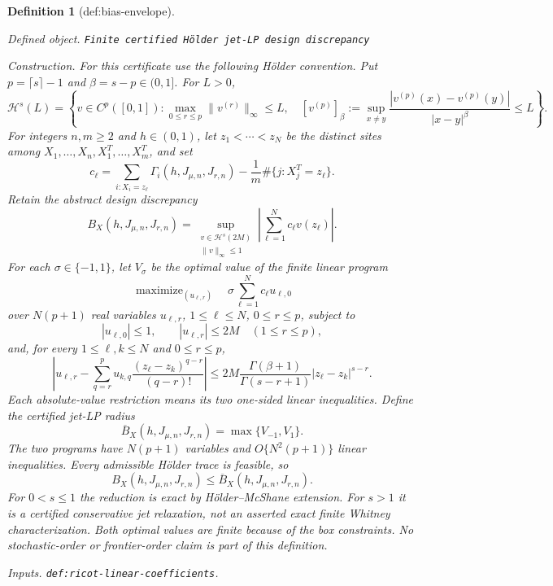 \documentclass{article}
\newtheorem{definition}{Definition}
\begin{document}
\begin{definition}[def:bias-envelope]\label{def:bias-envelope}
\par\smallskip\noindent\emph{Defined object.} \texttt{Finite certified Hölder jet-\allowbreak{}LP design discrepancy}
\par\smallskip\noindent\emph{Construction.} For this certificate use the following H\"older convention. Put \(p=\lceil s\rceil-1\) and \(\beta=s-p\in(0,1]\). For \(L>0\),
\[
\mathcal H^s(L)=\left\{v\in C^p([0,1]):
\max_{0\le r\le p}\|v^{(r)}\|_\infty\le L,
\quad
[v^{(p)}]_{\beta}:=\sup_{x\ne y}\frac{|v^{(p)}(x)-v^{(p)}(y)|}{|x-y|^\beta}\le L
\right\}.
\]
For integers \(n,m\ge2\) and \(h\in(0,1)\), let \(z_1<\cdots<z_N\) be the distinct sites among \(X_1,\ldots,X_n,X_1^T,\ldots,X_m^T\), and set
\[
c_\ell=\sum_{i:X_i=z_\ell}\Gamma_i(h,J_{\mu,n},J_{r,n})-
\frac1m\#\{j:X_j^T=z_\ell\}.
\]
Retain the abstract design discrepancy
\[
B_X(h,J_{\mu,n},J_{r,n})=
\sup_{\substack{v\in\mathcal H^s(2M)\\ \|v\|_\infty\le1}}
\left|\sum_{\ell=1}^Nc_\ell v(z_\ell)\right|.
\]
For each \(\sigma\in\{-1,1\}\), let \(V_\sigma\) be the optimal value of the finite linear program
\[
\operatorname{maximize}_{(u_{\ell,r})}\quad
\sigma\sum_{\ell=1}^Nc_\ell u_{\ell,0}
\]
over \(N(p+1)\) real variables \(u_{\ell,r}\), \(1\le\ell\le N\), \(0\le r\le p\), subject to
\[
|u_{\ell,0}|\le1,
\qquad
|u_{\ell,r}|\le2M\quad(1\le r\le p),
\]
and, for every \(1\le\ell,k\le N\) and \(0\le r\le p\),
\[
\left|u_{\ell,r}-\sum_{q=r}^p
u_{k,q}\frac{(z_\ell-z_k)^{q-r}}{(q-r)!}\right|
\le
2M\frac{\Gamma(\beta+1)}{\Gamma(s-r+1)}|z_\ell-z_k|^{s-r}.
\]
Each absolute-value restriction means its two one-sided linear inequalities. Define the certified jet-LP radius
\[
\overline B_X(h,J_{\mu,n},J_{r,n})=\max\{V_{-1},V_1\}.
\]
The two programs have \(N(p+1)\) variables and \(O\{N^2(p+1)\}\) linear inequalities. Every admissible H\"older trace is feasible, so
\[
B_X(h,J_{\mu,n},J_{r,n})\le\overline B_X(h,J_{\mu,n},J_{r,n}).
\]
For \(0<s\le1\) the reduction is exact by H\"older--McShane extension. For \(s>1\) it is a certified conservative jet relaxation, not an asserted exact finite Whitney characterization. Both optimal values are finite because of the box constraints. No stochastic-order or frontier-order claim is part of this definition.
\par\smallskip\noindent\emph{Inputs.} \texttt{def:\allowbreak{}ricot-\allowbreak{}linear-\allowbreak{}coefficients}.
\end{definition}
\end{document}
